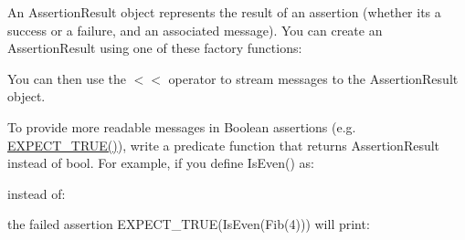 An {\ttfamily Assertion\+Result} object represents the result of an assertion (whether it\textquotesingle{}s a success or a failure, and an associated message). You can create an {\ttfamily Assertion\+Result} using one of these factory functions\+:


\begin{DoxyCode}{0}
\DoxyCodeLine{}
\DoxyCodeLine{}
\DoxyCodeLine{}
\DoxyCodeLine{\}}
\end{DoxyCode}


You can then use the {\ttfamily $<$$<$} operator to stream messages to the {\ttfamily Assertion\+Result} object.

To provide more readable messages in Boolean assertions (e.\+g. {\ttfamily \mbox{\hyperlink{gtest_8h_ac33e7cdfb5d44a7a0f0ab552eb5c3c6a}{E\+X\+P\+E\+C\+T\+\_\+\+T\+R\+U\+E()}}}), write a predicate function that returns {\ttfamily Assertion\+Result} instead of {\ttfamily bool}. For example, if you define {\ttfamily Is\+Even()} as\+:


\begin{DoxyCode}{0}
\DoxyCodeLine{\}}
\end{DoxyCode}


instead of\+:


\begin{DoxyCode}{0}
\DoxyCodeLine{\}}
\end{DoxyCode}


the failed assertion {\ttfamily E\+X\+P\+E\+C\+T\+\_\+\+T\+R\+UE(Is\+Even(\+Fib(4)))} will print\+:


\begin{DoxyCode}{0}
\end{DoxyCode}


